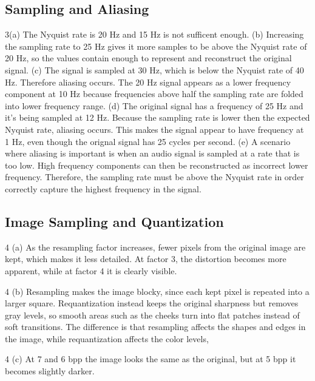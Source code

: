 \documentclass[11pt,a4paper]{article}
\begin{document}
\subsection{Sampling and Aliasing}
3(a) The Nyquist rate is 20 Hz and 15 Hz is not sufficent enough.
(b) Increasing the sampling rate to 25 Hz gives it more samples to be above the Nyquist rate of 20 Hz, so the values contain enough to represent and reconstruct the original signal.
(c) The signal is sampled at 30 Hz, which is below the Nyquist rate of 40 Hz. Therefore aliasing occurs. The 20 Hz signal appears as a lower frequency component at 10 Hz because frequencies above half the sampling rate are folded into lower frequency range.
(d) The original signal has a frequency of 25 Hz and it's being sampled at 12 Hz. Because the sampling rate is lower then the expected Nyquist rate, aliasing occurs. This makes the signal appear to have frequency at 1 Hz, even though the orignal signal has 25 cycles per second.
 (e) A scenario where aliasing is important is when an audio signal is sampled at a rate that is too low. High frequency components can then be reconstructed as incorrect lower frequency. Therefore, the sampling rate must be above the Nyquist rate in order correctly capture the highest frequency in the signal.
\subsection{Image Sampling and Quantization}
4 (a) As the resampling factor increases, fewer pixels from the original image are kept, which makes it less detailed. At factor 3, the distortion becomes more apparent, while at factor 4 it is clearly visible. 

4 (b) Resampling makes the image blocky, since each kept pixel is repeated into a larger square. Requantization instead keeps the original sharpness but removes gray levels, so smooth areas such as the cheeks turn into flat patches instead of soft transitions. The difference is that resampling affects the shapes and edges in the image, while requantization affects the color levels,

4 (c) At 7 and 6 bpp the image looks the same as the original, but at 5 bpp it becomes slightly darker.

\smallbreak
\end{document}
